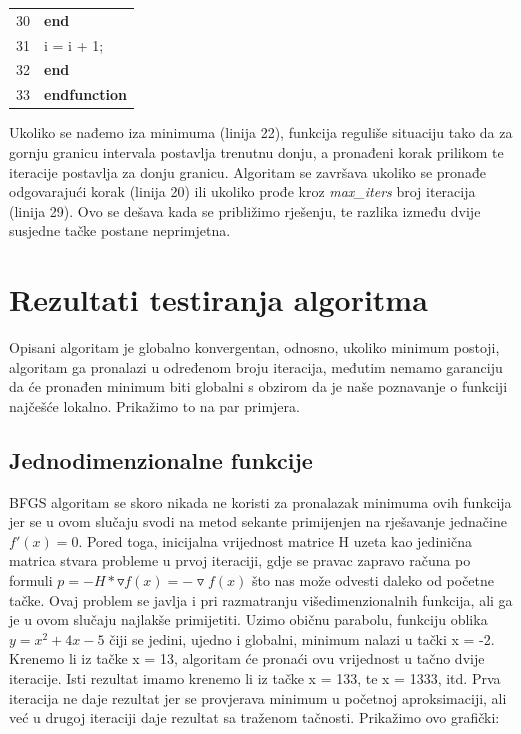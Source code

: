 \documentclass[bosnian,12pt,a4paper]{report}
\begin{document}
\begin{tabular}{ll}
30 & \hspace*{2cm}\textbf{end                                                                       } \\
31 & \hspace*{2cm}i = i + 1;                                                                 \\
32 & \hspace*{1cm}\textbf{end                                                                       } \\
33 & \textbf{endfunction                                                               } \\ \hline
\end{tabular}



\vspace*{0.5cm}


Ukoliko se nađemo iza minimuma (linija 22), funkcija reguliše situaciju tako da za gornju granicu intervala postavlja trenutnu donju, a pronađeni korak prilikom te iteracije postavlja za donju granicu. Algoritam se završava ukoliko se pronađe odgovarajući korak (linija 20) ili ukoliko prođe kroz \textit{max_iters} broj iteracija (linija 29). Ovo se dešava kada se približimo rješenju, te razlika između dvije susjedne tačke postane neprimjetna. 

\newpage
\section{Rezultati testiranja algoritma}

\justify
Opisani algoritam je globalno konvergentan, odnosno, ukoliko minimum postoji, algoritam ga pronalazi u određenom broju iteracija, međutim nemamo garanciju da će pronađen minimum biti globalni s obzirom da je naše poznavanje o funkciji najčešće lokalno. Prikažimo to na par primjera. 

\subsection{Jednodimenzionalne funkcije}

\justify
BFGS algoritam se skoro nikada ne koristi za pronalazak minimuma ovih funkcija jer se u ovom slučaju svodi na metod sekante primijenjen na rješavanje jednačine $f'(x) = 0$. Pored toga, inicijalna vrijednost matrice H uzeta kao jedinična matrica stvara probleme u prvoj iteraciji, gdje se pravac zapravo računa po formuli $p = - H * \triangledown f(x) = -\triangledown f(x)$ što nas može odvesti daleko od početne tačke. Ovaj problem se javlja i pri razmatranju višedimenzionalnih funkcija, ali ga je u ovom slučaju najlakše primijetiti.
\justify
Uzimo običnu parabolu, funkciju oblika $ y = x^2 + 4x - 5 $ čiji se jedini, ujedno i globalni, minimum nalazi u tački x = -2. Krenemo li iz tačke x = 13, algoritam će pronaći ovu vrijednost u tačno dvije iteracije. Isti rezultat imamo krenemo li iz tačke x = 133, te x = 1333, itd. Prva iteracija ne daje rezultat jer se provjerava minimum u početnoj aproksimaciji, ali već u drugoj iteraciji daje rezultat sa traženom tačnosti. Prikažimo ovo grafički:\\
\end{document}
